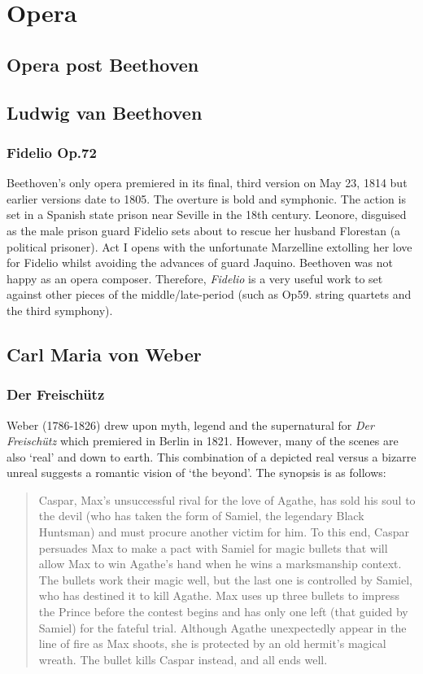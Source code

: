 
\chapter{Opera}
\label{opera}

\section{Opera post Beethoven}


\section{Ludwig van Beethoven}
\subsection{Fidelio Op.72}
Beethoven's only opera premiered in its final, third version on May 23, 1814 but earlier versions date to 1805.  The overture is bold and symphonic. The action is set in a Spanish state prison near Seville in the 18th century. Leonore, disguised as the male prison guard Fidelio sets about to rescue her husband Florestan (a political prisoner). Act I opens with the unfortunate Marzelline extolling her love for Fidelio whilst avoiding the advances of guard Jaquino. Beethoven was not happy as an opera composer. Therefore, \textit{Fidelio} is a very useful work to set against other pieces of the middle/late-period (such as Op59. string quartets and the third symphony).    

\section{Carl Maria von Weber}
\subsection{Der Freisch\"utz} 
Weber (1786-1826) drew upon myth, legend and the supernatural for \textit{Der Freisch\"utz} which premiered in Berlin in 1821. However, many of the scenes are also `real' and down to earth. This combination of a depicted real versus a bizarre unreal suggests a romantic vision of `the beyond'. The synopsis is as follows:

\begin{quotation}
Caspar, Max's unsuccessful rival for the love of Agathe, has sold his soul to the devil (who has taken the form of Samiel, the legendary Black Huntsman) and must procure another victim for him. To this end, Caspar persuades Max to make a pact with Samiel for magic bullets that will allow Max to win Agathe's hand when he wins a marksmanship context. The bullets work their magic well, but the last one is controlled by Samiel, who has destined it to kill Agathe. Max uses up three bullets to impress the Prince before the contest begins and has only one left (that guided by Samiel) for the fateful trial. Although Agathe unexpectedly appear in the line of fire as Max shoots, she is protected by an old hermit's magical wreath. The bullet kills Caspar instead, and all ends well. \citep[p640]{grout1996history} 
\end{quotation}

